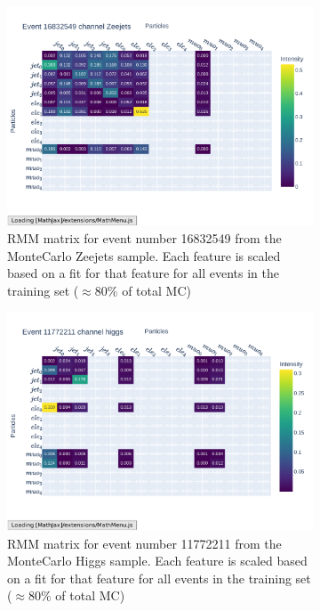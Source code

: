 \begin{figure}[h!]
    \centering
    \begin{subfigure}{.7\textwidth}
        \includegraphics[width=\textwidth]{Figures/rmms/rmm_event_16832549_Zeejets.pdf}
        \caption{RMM matrix for event number 16832549 from the MonteCarlo Zeejets sample. Each feature is scaled based on a fit for that feature for all events in the training set ($\approx 80\%$ of total MC)}
        \label{fig:rmm_zee_event}
    \end{subfigure}
    \hfill
    \begin{subfigure}{.7\textwidth}
        \includegraphics[width=\textwidth]{Figures/rmms/rmm_event_11772211_higgs.pdf}
        \caption{ RMM matrix for event number 11772211 from the MonteCarlo Higgs sample. Each feature is scaled based on a fit for that feature for all events in the training set ($\approx 80\%$ of total MC)}
        \label{fig:rmm_higgs_event}
    \end{subfigure}
    \hfill        
    \caption{}
    \label{fig:rmm_singular_events}
\end{figure}

